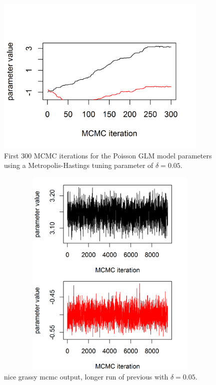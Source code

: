 \begin{figure}
\begin{center}
\includegraphics[height=3in,width=4in]{Ch2/figs/poissonmcmc2}
\end{center}
\caption{First 300 MCMC iterations for the Poisson GLM model parameters using
a Metropolis-Hastings tuning parameter of
 $\delta = 0.05$.}
\label{glms.fig.poissonmcmc2}
\end{figure}

\begin{figure}
\begin{center}
\includegraphics[height=4in,width=5in]{Ch2/figs/poissonmcmc3}
\end{center}
\caption{nice grassy mcmc output, longer run of previous with $\delta
  = 0.05$.}
\label{glms.fig.grassy}
\end{figure}

